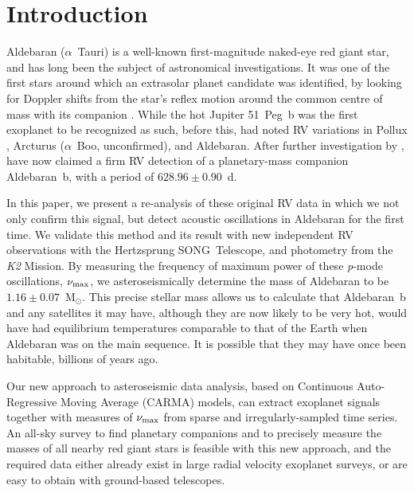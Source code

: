 \documentclass[modern]{aastex61}
\newcommand{\numax}{\mbox{$\nu_{\rm max}$}\xspace}
\newcommand{\msun}{\mbox{$\mathrm{M}_{\odot}$}\xspace}
\newcommand{\ktwo}{\emph{K2}\xspace}
\begin{document}
\section{Introduction}

Aldebaran ($\alpha$~Tauri) is a well-known first-magnitude naked-eye red giant star, and has long been the subject of astronomical investigations. It was one of the first stars around which an extrasolar planet candidate was identified, by looking for Doppler shifts from the star's reflex motion around the common centre of mass with its companion \citep[the radial velocity or RV method;][]{struverv}. While the hot Jupiter 51~Peg~b \citep{51peg} was the first exoplanet to be recognized as such, before this, \citet{hatzes1993} had noted RV variations in Pollux \citep[$\beta$~Gem; subsequently confirmed as a planet:][]{betgemconf,betgemconf2}, Arcturus ($\alpha$~Boo, unconfirmed), and Aldebaran. After further investigation by \citet{Hatzes1998}, \citet{Hatzes2015} have now claimed a firm RV detection of a planetary-mass companion Aldebaran~b, with a period of $628.96 \pm 0.90$~d. 

In this paper, we present a re-analysis of these original RV data in which we not only confirm this signal, but detect acoustic oscillations in Aldebaran for the first time. We validate this method and its result with new independent RV observations with the Hertzsprung SONG~Telescope, and photometry from the \ktwo Mission. By measuring the frequency of maximum power of these \emph{p}-mode oscillations, \numax, we asteroseismically determine the mass of Aldebaran to be $1.16 \pm 0.07$~\msun. This precise stellar mass allows us to calculate that Aldebaran~b and any satellites it may have, although they are now likely to be very hot, would have had equilibrium temperatures comparable to that of the Earth when Aldebaran was on the main sequence. It is possible that they may have once been habitable, billions of years ago.

Our new approach to asteroseismic data analysis, based on Continuous Auto-Regressive Moving Average (CARMA) models, can extract exoplanet signals together with measures of \numax from sparse and irregularly-sampled time series. An all-sky survey to find planetary companions and to precisely measure the masses of all nearby red giant stars is feasible with this new approach, and the required data either already exist in large radial velocity exoplanet surveys, or are easy to obtain with ground-based telescopes.
\end{document}
